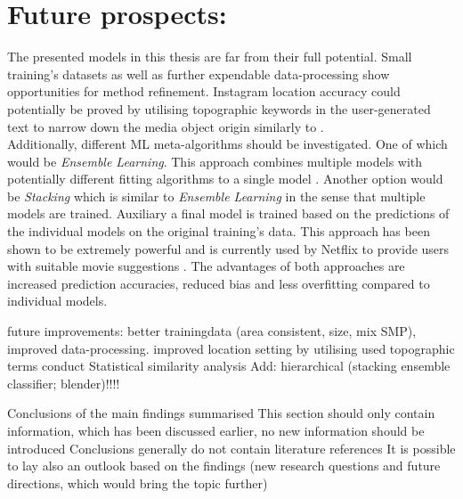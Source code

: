 \section*{Future prospects:} The presented models in this thesis are far from their full potential. Small training's datasets as well as further expendable data-processing show opportunities for method refinement. Instagram location accuracy could potentially be proved by utilising topographic keywords in the user-generated text to narrow down the media object origin similarly to \parencite{Ostermann2015}. \\
Additionally, different ML meta-algorithms should be investigated. One of which would be \textit{Ensemble Learning}. This approach combines multiple models with potentially different fitting algorithms to a single model \parencite{Zhou2009}. Another option would be \textit{Stacking} which is similar to \textit{Ensemble Learning} in the sense that multiple models are trained. Auxiliary a final model is trained based on the predictions of the individual models on the original training's data. This approach has been shown to be extremely powerful and is currently used by Netflix to provide users with suitable movie suggestions \parencite{AndreasToscher2009}. The advantages of both approaches are increased prediction accuracies, reduced bias and less overfitting compared to individual models. 



future improvements: better trainingdata (area consistent, size, mix SMP), improved data-processing. improved location setting by utilising used topographic terms
conduct Statistical similarity analysis
Add: hierarchical (stacking ensemble classifier; blender)!!!!

    Conclusions of the main findings summarised
    This section should only contain information, which has been discussed earlier, no new information should be introduced
    Conclusions generally do not contain literature references
    It is possible to lay also an outlook based on the findings (new research questions and future directions, which would bring the topic further)


